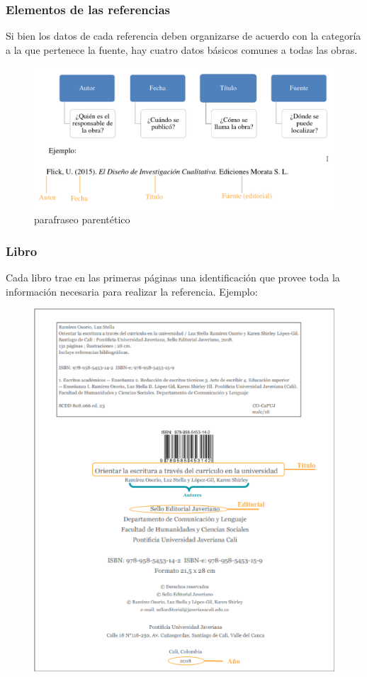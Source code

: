 \documentclass[
11pt, %
]{beamer}
\begin{document}
\begin{frame}
	\frametitle{Elementos de las referencias}

	Si bien los datos de cada referencia deben organizarse de acuerdo con la categoría a
	la que pertenece la fuente, hay cuatro datos básicos comunes a todas las obras.

	\begin{exampleblock}{}
		\begin{figure}
			\centering
			\includegraphics[width=1\linewidth]{images/screenshot008}
			\caption{parafraseo parentético}
			\label{fig:screenshot008}
		\end{figure}
	\end{exampleblock}

\end{frame}

\begin{frame}
	\frametitle{Libro}

	Cada libro trae en las primeras páginas una identificación que provee toda la
	información necesaria para realizar la referencia. Ejemplo:

	\begin{exampleblock}{}
\begin{figure}
	\centering
	\includegraphics[width=0.4\linewidth]{images/screenshot009}
	\label{fig:screenshot009}
\end{figure}
	\end{exampleblock}

\end{frame}
\end{document}
